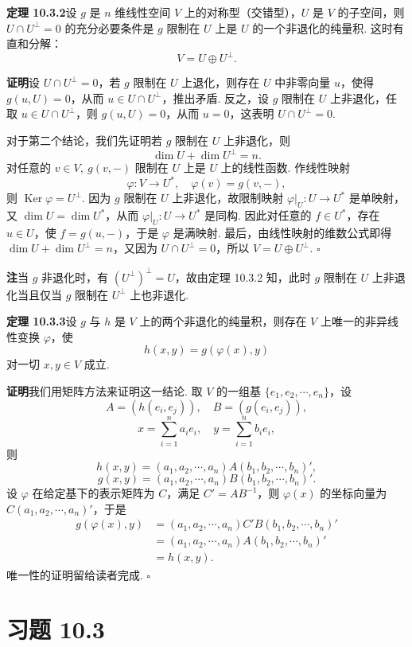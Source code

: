 \documentclass[UTF8,12pt,a4paper,fontset=fandol]{ctexart}
\begin{document}
\noindent\textbf{定理 10.3.2}\quad 设 $g$ 是 $n$ 维线性空间 $V$ 上的对称型（交错型），$U$ 是 $V$ 的子空间，则 $U\cap U^\perp=0$ 的充分必要条件是 $g$ 限制在 $U$ 上是 $U$ 的一个非退化的纯量积. 这时有直和分解：
\[
  V=U\oplus U^\perp.
\]

\noindent\textbf{证明}\quad 设 $U\cap U^\perp=0$，若 $g$ 限制在 $U$ 上退化，则存在 $U$ 中非零向量 $u$，使得 $g(u,U)=0$，从而 $u\in U\cap U^\perp$，推出矛盾. 反之，设 $g$ 限制在 $U$ 上非退化，任取 $u\in U\cap U^\perp$，则 $g(u,U)=0$，从而 $u=0$，这表明 $U\cap U^\perp=0$.

对于第二个结论，我们先证明若 $g$ 限制在 $U$ 上非退化，则
\[
  \dim U+\dim U^\perp=n.
\]
对任意的 $v\in V,\ g(v,-)$ 限制在 $U$ 上是 $U$ 上的线性函数. 作线性映射
\[
  \varphi:V\to U^*,\quad \varphi(v)=g(v,-),
\]
则 $\operatorname{Ker}\varphi=U^\perp$. 因为 $g$ 限制在 $U$ 上非退化，故限制映射 $\varphi|_U:U\to U^*$ 是单映射，又 $\dim U=\dim U^*$，从而 $\varphi|_U:U\to U^*$ 是同构. 因此对任意的 $f\in U^*$，存在 $u\in U$，使 $f=g(u,-)$，于是 $\varphi$ 是满映射. 最后，由线性映射的维数公式即得 $\dim U+\dim U^\perp=n$，又因为 $U\cap U^\perp=0$，所以 $V=U\oplus U^\perp$. $\square$

\noindent\textbf{注}\quad 当 $g$ 非退化时，有 $(U^\perp)^\perp=U$，故由定理 10.3.2 知，此时 $g$ 限制在 $U$ 上非退化当且仅当 $g$ 限制在 $U^\perp$ 上也非退化.

\noindent\textbf{定理 10.3.3}\quad 设 $g$ 与 $h$ 是 $V$ 上的两个非退化的纯量积，则存在 $V$ 上唯一的非异线性变换 $\varphi$，使
\[
  h(x,y)=g(\varphi(x),y)
\]
对一切 $x,y\in V$ 成立.

\noindent\textbf{证明}\quad 我们用矩阵方法来证明这一结论. 取 $V$ 的一组基 $\{e_1,e_2,\cdots,e_n\}$，设
\[
  A=(h(e_i,e_j)),\quad B=(g(e_i,e_j)),
\]
\[
  x=\sum_{i=1}^n a_ie_i,\quad y=\sum_{i=1}^n b_ie_i,
\]
则
\[
  h(x,y)=(a_1,a_2,\cdots,a_n)A(b_1,b_2,\cdots,b_n)',
\]
\[
  g(x,y)=(a_1,a_2,\cdots,a_n)B(b_1,b_2,\cdots,b_n)'.
\]
设 $\varphi$ 在给定基下的表示矩阵为 $C$，满足 $C'=AB^{-1}$，则 $\varphi(x)$ 的坐标向量为 $C(a_1,a_2,\cdots,a_n)'$，于是
\[
\begin{aligned}
  g(\varphi(x),y)&=(a_1,a_2,\cdots,a_n)C'B(b_1,b_2,\cdots,b_n)'\\
  &=(a_1,a_2,\cdots,a_n)A(b_1,b_2,\cdots,b_n)'\\
  &=h(x,y).
\end{aligned}
\]
唯一性的证明留给读者完成. $\square$

\section*{习题 10.3}
\end{document}
